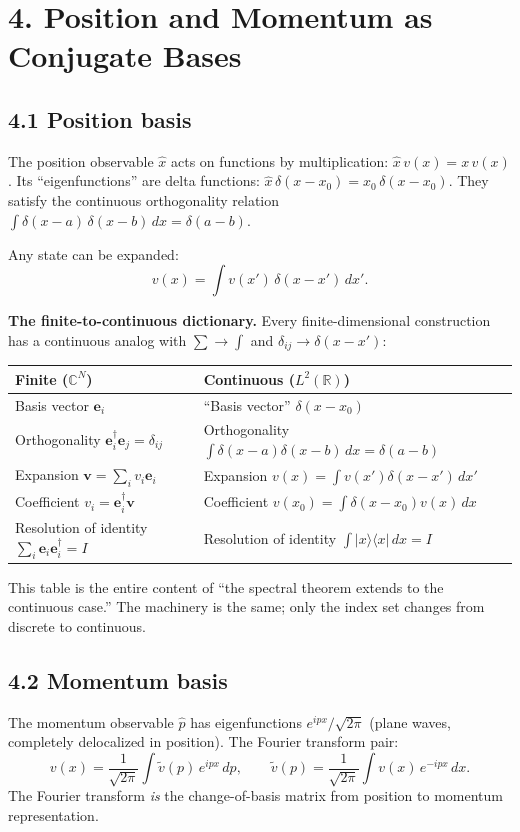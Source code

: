 \documentclass[12pt,a4paper]{article}
\begin{document}
\section{4. Position and Momentum as Conjugate Bases}

\subsection{4.1 Position basis}
The position observable $\hat{x}$ acts on functions by multiplication: $\hat{x}\,v(x)=x\,v(x)$.  Its ``eigenfunctions'' are delta functions: $\hat{x}\,\delta(x-x_0) = x_0\,\delta(x-x_0)$.  They satisfy the continuous orthogonality relation $\int \delta(x-a)\,\delta(x-b)\,dx = \delta(a-b)$.

Any state can be expanded:
\[
    v(x) = \int v(x')\,\delta(x-x')\,dx'.
\]

\medskip
\noindent\textbf{The finite-to-continuous dictionary.}  Every finite-dimensional construction has a continuous analog with $\sum\to\int$ and $\delta_{ij}\to\delta(x-x')$:

\medskip
\begin{center}
\begin{tabular}{l|l}
\textbf{Finite ($\mathbb{C}^N$)} & \textbf{Continuous ($L^2(\mathbb{R})$)} \\ \hline
Basis vector $\mathbf{e}_i$ & ``Basis vector'' $\delta(x-x_0)$ \\
Orthogonality $\mathbf{e}_i^\dagger\mathbf{e}_j = \delta_{ij}$ & Orthogonality $\int\delta(x-a)\delta(x-b)\,dx = \delta(a-b)$ \\
Expansion $\mathbf{v}=\sum_i v_i\mathbf{e}_i$ & Expansion $v(x)=\int v(x')\delta(x-x')\,dx'$ \\
Coefficient $v_i = \mathbf{e}_i^\dagger\mathbf{v}$ & Coefficient $v(x_0)=\int \delta(x-x_0)v(x)\,dx$ \\
Resolution of identity $\sum_i\mathbf{e}_i\mathbf{e}_i^\dagger = I$ & Resolution of identity $\int|x\rangle\langle x|\,dx = I$ \\
\end{tabular}
\end{center}

\noindent This table is the entire content of ``the spectral theorem extends to the continuous case.''  The machinery is the same; only the index set changes from discrete to continuous.

\subsection{4.2 Momentum basis}
The momentum observable $\hat{p}$ has eigenfunctions $e^{ipx}/\sqrt{2\pi}$ (plane waves, completely delocalized in position).  The Fourier transform pair:
\[
    v(x) = \frac{1}{\sqrt{2\pi}}\int \tilde{v}(p)\,e^{ipx}\,dp, \qquad
    \tilde{v}(p) = \frac{1}{\sqrt{2\pi}}\int v(x)\,e^{-ipx}\,dx.
\]
The Fourier transform \emph{is} the change-of-basis matrix from position to momentum representation.
\end{document}
